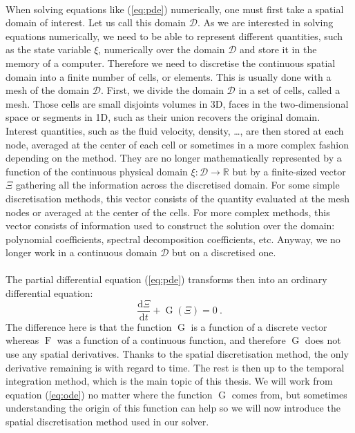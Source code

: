     \paragraph{}
    When solving equations like (\ref{eq:pde}) numerically, one must first take a spatial domain of interest.
    Let us call this domain $\mathcal{D}$.
    As we are interested in solving equations numerically, we need to be able to represent different quantities, such as the state variable $\xi$, numerically over the domain $\mathcal{D}$ and store it in the memory of a computer.
    Therefore we need to discretise the continuous spatial domain into a finite number of cells, or elements.
    This is usually done with a mesh of the domain $\mathcal{D}$.
    First, we divide the domain $\mathcal{D}$ in a set of cells, called a mesh.
    Those cells are small disjoints volumes in 3D, faces in the two-dimensional space or segments in 1D, such as their union recovers the original domain.
    Interest quantities, such as the fluid velocity, density, \dots, are then stored at each node, averaged at the center of each cell or sometimes in a more complex fashion depending on the method.
    They are no longer mathematically represented by a function of the continuous physical domain $\xi: \mathcal{D} \rightarrow \mathbb{R}$ but by a finite-sized vector $\Xi$ gathering all the information across the discretised domain.
    For some simple discretisation methods, this vector consists of the quantity evaluated at the mesh nodes or averaged at the center of the cells.
    For more complex methods, this vector consists of information used to construct the solution over the domain: polynomial coefficients, spectral decomposition coefficients, etc.
    Anyway, we no longer work in a continuous domain $\mathcal{D}$ but on a discretised one.

    \paragraph{}
    The partial differential equation (\ref{eq:pde}) transforms then into an ordinary differential equation:
    \begin{equation}\label{eq:ode}
      \frac{\mathrm{d} \Xi}{\mathrm{d} t} + \operatorname{G}\left(\Xi\right) = 0 \ .
    \end{equation}
    The difference here is that the function $\operatorname{G}$ is a function of a discrete vector whereas $\operatorname{F}$ was a function of a continuous function, and therefore $\operatorname{G}$ does not use any spatial derivatives.
    Thanks to the spatial discretisation method, the only derivative remaining is with regard to time.
    The rest is then up to the temporal integration method, which is the main topic of this thesis.
    We will work from equation (\ref{eq:ode}) no matter where the function $\operatorname{G}$ comes from, but sometimes understanding the origin of this function can help so we will now introduce the spatial discretisation method used in our solver.


